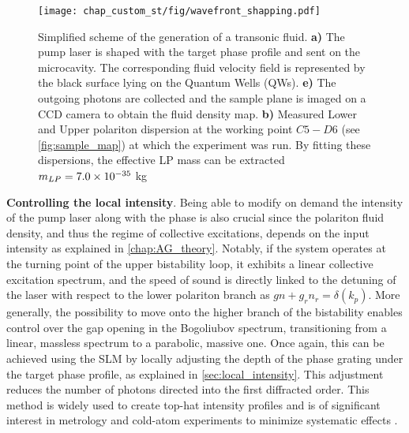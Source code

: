 \begin{figure}[t!]
    \centering
    \texttt{[image: chap\_custom\_st/fig/wavefront\_shapping.pdf]}
    \caption{Simplified scheme of the generation of a transonic fluid. \textbf{a)} The pump laser is shaped with the target phase profile and sent on the microcavity. The corresponding fluid velocity field is represented by the black surface lying on the Quantum Wells (QWs). \textbf{e)} The outgoing photons are collected and the sample 
    plane is imaged on a CCD camera to obtain the fluid density map.  \textbf{b)} Measured Lower and Upper polariton dispersion at the working point $C5-D6$ (see \autoref{fig:sample_map}) at which the experiment was run. By fitting these dispersions,
    the effective LP mass can be extracted $m_{LP}= 7.0 \times 10^{-35}$ kg}
    \label{fig:wavefront_shapping}
\end{figure}


\bigskip 

\textbf{Controlling the local intensity}. Being able to modify on demand the intensity of the pump laser along with the phase is also crucial since the polariton fluid density, and thus the regime of collective excitations, depends on the input intensity as explained in \autoref{chap:AG_theory}. 
Notably, if the system operates at the turning point of the upper bistability loop, it exhibits a linear collective excitation spectrum, and the speed of sound is directly linked to the detuning of the laser with respect to the lower polariton branch as $gn+g_rn_r=\delta(k_p)$. 
More generally, the possibility to move onto the higher branch of the bistability enables control over the gap opening in the Bogoliubov spectrum, transitioning from a linear, massless spectrum to a parabolic, massive one.  
Once again, this can be achieved using the SLM by locally adjusting the depth of the phase grating under the target phase profile, as explained in \autoref{sec:local_intensity}. This adjustment reduces the number of photons directed into the first diffracted order. This method is widely used to create top-hat intensity profiles and is of significant interest in metrology and cold-atom experiments to minimize systematic effects \cite{top_metrology_2018}.  

\bigskip

